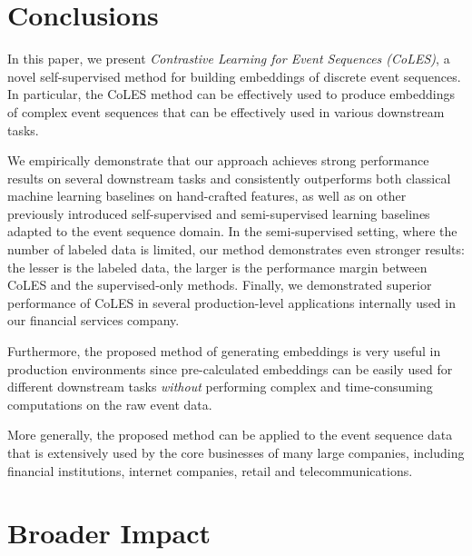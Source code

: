 \documentclass[sigconf, anonymous]{acmart}
\begin{document}
\section{Conclusions} \label{sec-conclusions}

In this paper, we present \emph{Contrastive Learning for Event Sequences (CoLES)}, a novel self-supervised method for building embeddings of discrete event sequences.
In particular, the CoLES method can be effectively
used to produce embeddings of complex event sequences that can be effectively used in various downstream tasks.

We empirically demonstrate that our approach achieves strong performance results on several downstream tasks and consistently outperforms both classical machine learning baselines on hand-crafted features, as well as on other  previously introduced  self-supervised and semi-supervised learning baselines adapted to the event sequence domain.
In the semi-supervised setting, where the number of labeled data is limited, our method demonstrates even stronger results: the lesser is the labeled data, the larger is the performance margin between CoLES and the supervised-only methods.
Finally, we demonstrated superior performance of CoLES in several production-level applications internally used in our financial services company.

Furthermore, the proposed method of generating embeddings is very useful in production environments since pre-calculated embeddings can be easily used for different downstream tasks \emph{without} performing complex and time-consuming computations on the raw event data.

More generally, the proposed method can be applied to the event sequence data that is extensively used by the core businesses of many large companies, including financial institutions, internet companies, retail and telecommunications.

\iffalse

\section*{Broader Impact}
\end{document}
